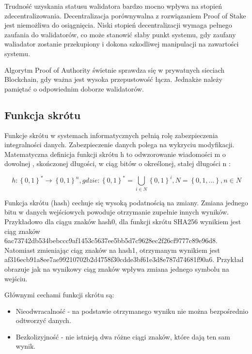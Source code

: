\documentclass[a4paper,13pt]{report}
\begin{document}
Trudność uzyskania statusu walidatora bardzo mocno wpływa na stopień zdecentralizowania. Decentralizacja porównywalna z rozwiązaniem Proof of Stake jest niemożliwa do osiągnięcia.
Niski stopień decentralizacji wymaga pełnego zaufania do walidatorów, co może stanowić słaby punkt systemu, gdy zaufany waliadator zostanie przekupiony i dokona szkodliwej manipulacji na zawartości systemu.

Algorytm Proof of Authority świetnie sprawdza się w prywatnych sieciach Blockchain, gdy ważna jest wysoka przepustowość łącza. Jednakże należy pamiętać o odpowiednim doborze walidatorów.

\subsection{Funkcja skrótu}

Funkcje skrótu w systemach informatycznych pełnią rolę zabezpieczenia integralności danych. Zabezpieczenie danych polega na wykryciu modyfikacji. Matematyczna definicja funkcji skrótu h to odwzorowanie wiadomości m o dowolnej , skończonej długości, w ciąg bitów o określonej, stałej długości n \cite{hash}:

\begin{equation}
h:\left \{0, 1\right \}^{*}\rightarrow \left \{0, 1\right \}^{n}, gdzie: \left \{0, 1\right \}^{*}=\bigcup_{i\in  N}\left \{0, 1\right \}^{i}, N = \left \{0, 1, ...\right \}, n \in N
\end{equation}

Funkcja skrótu (hash) cechuje się wysoką podatnością na zmiany. Zmiana jednego bitu w danych wejściowych powoduje otrzymanie zupełnie innych wyników. \newline 
Przykładowo dla ciągu znaków hash0, dla funkcji skrótu SHA256 wynikiem jest ciąg znaków 
\newline 6ac73742db534bebccc9af1453c5637ee5bb5d7c9628ec2f26cf9777c89e96d8. Natomiast zmieniając ciąg znaków na hash1, otrzymanym wynikiem jest \newline af316ecb91a8ee7ae99210702b2d4758f30cdde3bf61e3d8e787d74681f90a6. Przykład obrazuje jak na wynikowy ciąg znaków wpływa zmiana jednego symbolu na wejściu.

Głównymi cechami funkcji skrótu są:
\begin{itemize}
	\item Nieodwracalność - na podstawie otrzymanego wyniku nie można bezpośrednio odtworzyć danych.
	\item Bezkolizyjność - nie istnieją dwa różne ciągi znaków, które dają ten sam wynik.
\end{itemize}
\end{document}
